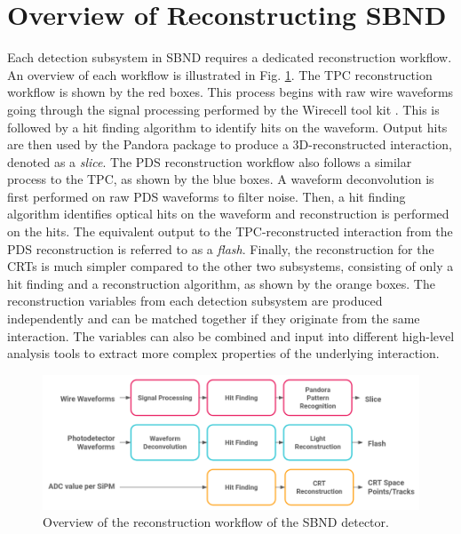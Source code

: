 \newpage


\section{Overview of Reconstructing SBND}
\label{sec:reco_overview}

Each detection subsystem in SBND requires a dedicated reconstruction workflow.
An overview of each workflow is illustrated in Fig. \ref{fig:Reco_Workflow}.
The TPC reconstruction workflow is shown by the red boxes.
This process begins with raw wire waveforms going through the signal processing performed by the Wirecell tool kit \cite{wirecell}.
This is followed by a hit finding algorithm to identify hits on the waveform.
Output hits are then used by the Pandora package \cite{pandora} to produce a 3D-reconstructed interaction, denoted as a \textit{slice}.
The PDS reconstruction workflow also follows a similar process to the TPC, as shown by the blue boxes.
A waveform deconvolution is first performed on raw PDS waveforms to filter noise.
Then, a hit finding algorithm identifies optical hits on the waveform and reconstruction is performed on the hits.
The equivalent output to the TPC-reconstructed interaction from the PDS reconstruction is referred to as a \textit{flash}.
Finally, the reconstruction for the CRTs is much simpler compared to the other two subsystems, consisting of only a hit finding and a reconstruction algorithm, as shown by the orange boxes.
The reconstruction variables from each detection subsystem are produced independently and can be matched together if they originate from the same interaction. 
The variables can also be combined and input into different high-level analysis tools to extract more
 complex properties of the underlying interaction. 

\begin{figure}[htbp!] 
\centering    
\includegraphics[width=1.0\textwidth]{Reco_Workflow}
\caption[Reco_Workflow]{
Overview of the reconstruction workflow of the SBND detector.
}
\label{fig:Reco_Workflow}
\end{figure}

